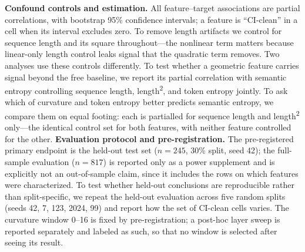 \documentclass[11pt]{article}
\begin{document}
\textbf{Confound controls and estimation.} All feature--target associations are partial correlations, with bootstrap 95\% confidence intervals; a feature is ``CI-clean'' in a cell when its interval excludes zero. To remove length artifacts we control for sequence length and its square throughout---the nonlinear term matters because linear-only length control leaks signal that the quadratic term removes. Two analyses use these controls differently. To test whether a geometric feature carries signal beyond the free baseline, we report its partial correlation with semantic entropy controlling sequence length, length\textsuperscript{2}, and token entropy jointly. To ask which of curvature and token entropy better predicts semantic entropy, we compare them on equal footing: each is partialled for sequence length and length\textsuperscript{2} only---the identical control set for both features, with neither feature controlled for the other.
\textbf{Evaluation protocol and pre-registration.} The pre-registered primary endpoint is the held-out test set ($n=245$, 30\% split, seed 42); the full-sample evaluation ($n=817$) is reported only as a power supplement and is explicitly not an out-of-sample claim, since it includes the rows on which features were characterized. To test whether held-out conclusions are reproducible rather than split-specific, we repeat the held-out evaluation across five random splits (seeds 42, 7, 123, 2024, 99) and report how the set of CI-clean cells varies. The curvature window 0--16 is fixed by pre-registration; a post-hoc layer sweep is reported separately and labeled as such, so that no window is selected after seeing its result.
\end{document}
